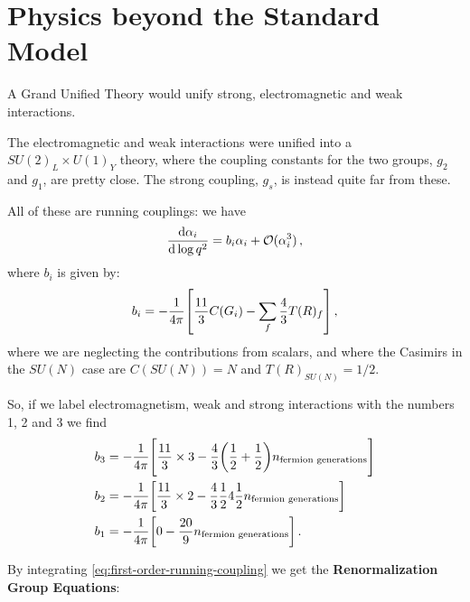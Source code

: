 \documentclass[main.tex]{subfiles}
\begin{document}
\section{Physics beyond the Standard Model}


A Grand Unified Theory would unify strong, electromagnetic and weak interactions. 

The electromagnetic and weak interactions were unified into a \(SU(2)_L \times U(1)_Y\) theory, where the coupling constants for the two groups, \(g_2 \) and \(g_1 \), are pretty close. 
The strong coupling, \(g_s\), is instead quite far from these.

All of these are running couplings: we have 
%
\begin{align} \label{eq:first-order-running-coupling}
\dv{\alpha _i}{\log q^2} = b_i \alpha_{i} + \mathcal{O}(\alpha_{i}^3)
\,,
\end{align}
%
where \(b_i\) is given by: 
%
\begin{align}
b_i = - \frac{1}{4 \pi } \qty[ \frac{11}{3} C(G_i) - \sum _{f} \frac{4}{3} T(R)_f]
\,,
\end{align}
%
where we are neglecting the contributions from scalars, and where the Casimirs in the \(SU(N)\) case are \(C(SU(N)) = N\) and \(T(R)_{SU(N)} = 1/2\).

So, if we label electromagnetism, weak and strong interactions with the numbers 1, 2 and 3 we find 
%
\begin{align}
b_3 &= - \frac{1}{4 \pi } \qty[ \frac{11}{3} \times 3 - \frac{4}{3} \qty( \frac{1}{2} + \frac{1}{2}) n _{\text{fermion generations}}] \\
b_2 &= - \frac{1}{4 \pi } \qty[ \frac{11}{3} \times 2 - \frac{4}{3} \frac{1}{2}  4 \frac{1}{2} n _{\text{fermion generations}} ] \\
b_1 &= - \frac{1}{4 \pi } \qty[ 0  - \frac{20}{9} n _{\text{fermion generations}} ]
\,.
\end{align}


By integrating \eqref{eq:first-order-running-coupling} we get the \textbf{Renormalization Group Equations}: 
%
\end{document}
